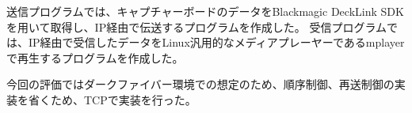 送信プログラムでは、キャプチャーボードのデータをBlackmagic DeckLink SDK\cite{bmd-decklink-sdk}を用いて取得し、IP経由で伝送するプログラムを作成した。
受信プログラムでは、IP経由で受信したデータをLinux汎用的なメディアプレーヤーであるmplayerで再生するプログラムを作成した\cite{bmd-4k-streaming}。

今回の評価ではダークファイバー環境での想定のため、順序制御、再送制御の実装を省くため、TCPで実装を行った。

